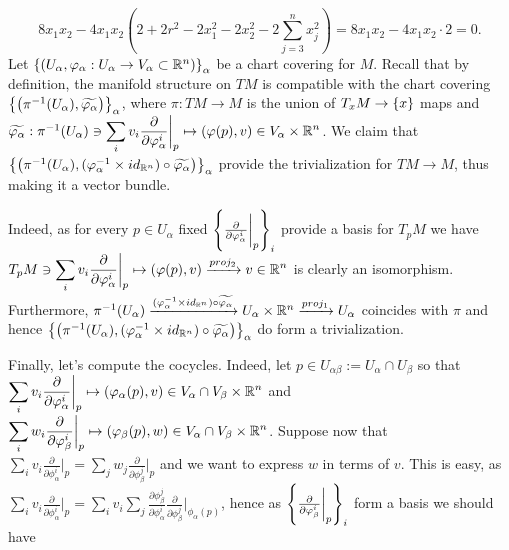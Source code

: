 \documentclass[8pt]{article} %
\begin{document}
\[8x_1x_2-4x_1x_2(2+2r^2-2x_1^2-2x_2^2-2\sum_{ j=3}^nx_j^2)=8x_1x_2-4x_1x_2\cdot2=0.\]
Let $\left\{\left( U_\alpha,\varphi_\alpha:U_\alpha\to V_\alpha\subset\mathbb{R}^n \right)\right\}_\alpha$ be a chart covering for $M$.
Recall that by definition, the manifold structure on $TM$ is compatible with the chart covering 
$\left\{ \left(\pi^{ -1 }(U_\alpha),\widetilde{ \varphi_\alpha }  \right) \right\}_\alpha$, where $\pi:TM\to M$ is
the union of $T_xM\to\left\{ x \right\}$ maps and $\widetilde{\phi_\alpha}:\pi^{ -1 }(U_\alpha)\ni
\sum_iv_i\frac{ \partial }
{ \partial \phi_\alpha^i }\bigg|_p\mapsto
(\phi(p),v)\in V_\alpha\times\R^n$. We claim that 
$\left\{ \left(\pi^{ -1 }(U_\alpha),(\varphi_\alpha^{ -1 }\times id_{ \mathbb{R}^n })\circ\widetilde{ \varphi_\alpha }  \right) \right\}_\alpha$ provide the trivialization for $TM\to M$, thus making it a vector bundle.\par
Indeed, as for every $p\in U_\alpha$ fixed $\left\{ \frac{\partial}{ \partial \varphi_\alpha^i }\bigg|_p \right\}_i$ provide a basis 
for $T_pM$ we have $T_pM\ni\sum_iv_i\frac{ \partial }
{ \partial \phi_\alpha^i }\bigg|_p\mapsto (\phi(p),v)\xrightarrow{ proj_2 }v\in\R^n$ is clearly an isomorphism. Furthermore,
$\pi^{ -1 }(U_\alpha)\xrightarrow{ (\varphi_\alpha^{ -1 }\times id_{ \mathbb{R}^n })\circ\widetilde{\varphi_\alpha }}U_\alpha\times\mathbb{R}^n\xrightarrow
{proj_1}U_\alpha$ coincides with $\pi$ and hence 
$\left\{ \left(\pi^{ -1 }(U_\alpha),(\varphi_\alpha^{ -1 }\times id_{ \mathbb{R}^n })\circ\widetilde{ \varphi_\alpha }  \right) \right\}_\alpha$ do form
a trivialization.\par
Finally, let's compute the cocycles. Indeed, let $p\in U_{ \alpha\beta }:=U_\alpha\cap U_\beta$ so
that
$\sum_iv_i\frac{ \partial }{ \partial \phi_\alpha^i }\bigg|_p
\mapsto(\phi_\alpha(p),v)\in V_{ \alpha }\cap V_{ \beta }\times\R^n$ and
$\sum_iw_i\frac{ \partial }
{ \partial \phi_\beta^i }\bigg|_p\mapsto(\phi_\beta(p),w)\in V_{ \alpha }\cap V_{ \beta }\times\R^n$.
Suppose now that 
$\sum_iv_i\frac{ \partial }{ \partial \phi_\alpha^i }\bigg|_p=
\sum_jw_j\frac{ \partial }{ \partial \phi_\beta^j }\bigg|_p$ and we want to express $w$ in terms of $v$.
This is easy, as $\sum_iv_i\frac{ \partial }{ \partial \phi_\alpha^i }\bigg|_p=\sum_iv_i\sum_j\frac{ \partial\phi_\beta^j }{ \partial
\phi_\alpha^i}\frac{ \partial }{ \partial \phi_\beta^j }\bigg|_{ \phi_\alpha(p) }$, hence as 
$\left\{ \frac{\partial}{ \partial \varphi_\beta^i }\bigg|_p \right\}_i$ form a basis we should have
\end{document}
